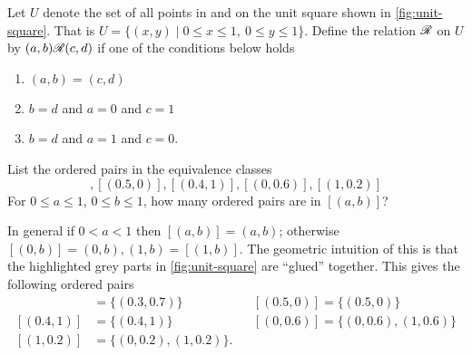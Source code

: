 \documentclass[a4paper, english, 12pt]{article} %
\begin{document}
\newpageanswer

\begin{problem}
  Let $U$ denote the set of all points in and on the unit square shown in
  \cref{fig:unit-square}. That is $U = \{ (x,y) \mid 0 \leq x \leq 1, \ 0 \leq y
  \leq 1\}$. Define the relation $\mathscr{R}$ on $U$ by $(a,b) \mathscr{R} (c,d)$ if one of the
  conditions below holds
  
  \begin{minipage}[c]{0.5\textwidth}
  \begin{enumerate}
    \item $(a,b) = (c,d)$
    \item $b = d$ and $a = 0$ and $c = 1$
    \item $b = d$ and $a = 1$ and $c = 0$.
  \end{enumerate}
  \end{minipage}
  \begin{minipage}[c]{0.5\textwidth}
    \centering
    \label{fig:unit-square}
  \end{minipage}
\end{problem}

\begin{subproblem}[2]
  List the ordered pairs in the equivalence classes
  \begin{equation}
    [(0.3, 0.7)], [(0.5, 0)], [(0.4, 1)], [(0, 0.6)], [(1, 0.2)]
  \end{equation}
  For $0 \leq a \leq 1$, $0 \leq b \leq 1$, how many ordered pairs are in $[(a,b)]$?
\end{subproblem}
  
\begin{answer}
  \noindent
  In general if $0 < a < 1$ then $[(a,b)] = {(a,b)}$; otherwise $[(0,b)] =
  {(0,b), (1, b)} = [(1, b)]$. The geometric intuition of this is that the
  highlighted grey parts in \cref{fig:unit-square} are ``glued'' together. This
  gives the following ordered pairs
  \begin{align*}
    [(0.3, 0.7)] & = \{ (0.3, 0.7)\}
    &&[(0.5, 0)] = \{ (0.5, 0)\} \\
    [(0.4, 1)] &= \{(0.4, 1)\}
    &&[(0, 0.6)] = \{ (0, 0.6), (1, 0.6)\} \\
    [(1,0.2)] &= \{(0, 0.2), (1, 0.2)\}.
  \end{align*}
\end{answer}
\end{document}
